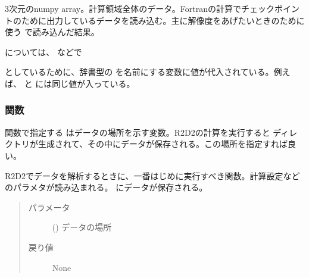 \documentclass[letterpaper,10pt,dvipdfmx,report]{sphinxmanual}
\begin{document}
\begin{fulllineitems}
\label{\detokenize{io:qc}}
3次元のnumpy array。計算領域全体のデータ。Fortranの計算でチェックポイントのために出力しているデータを読み込む。主に解像度をあげたいときのために使う  で読み込んだ結果。

\end{fulllineitems}


 については、 などで

\begin{sphinxVerbatim}[commandchars=\\\{\}]
   
       \PYG{l+s+s1}{R2D2.p[}\PYG{l+s+s1}{]}
\end{sphinxVerbatim}

としているために、辞書型の  を名前にする変数に値が代入されている。例えば、  と  には同じ値が入っている。


\subsubsection{関数}
\label{\detokenize{io:id5}}
関数で指定する  はデータの場所を示す変数。R2D2の計算を実行すると  ディレクトリが生成されて、その中にデータが保存される。この場所を指定すれば良い。

\begin{fulllineitems}
\label{\detokenize{io:read_init}}
R2D2でデータを解析するときに、一番はじめに実行すべき関数。計算設定などのパラメタが読み込まれる。  にデータが保存される。
\begin{quote}\begin{description}
\item[{パラメータ}] \leavevmode
{} () \sphinxhyphen{}\sphinxhyphen{} データの場所

\item[{戻り値}] \leavevmode
None

\end{description}\end{quote}

\end{fulllineitems}
\end{document}
